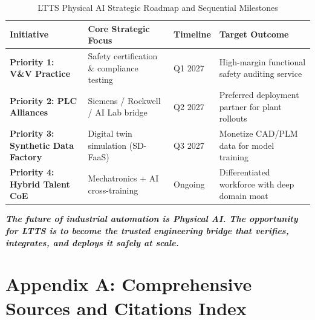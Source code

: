 \documentclass[11pt,a4paper]{article}
\begin{document}
\begin{table}[h!]
\centering
\small
\begin{tabularx}{\textwidth}{@{}l p{4.2cm} l X@{}}
\toprule
\textbf{Initiative} & \textbf{Core Strategic Focus} & \textbf{Timeline} & \textbf{Target Outcome} \\
\midrule
\textbf{Priority 1: V\&V Practice} & Safety certification \& compliance testing & Q1 2027 & High-margin functional safety auditing service \\
\textbf{Priority 2: PLC Alliances} & Siemens / Rockwell / AI Lab bridge & Q2 2027 & Preferred deployment partner for plant rollouts \\
\textbf{Priority 3: Synthetic Data Factory} & Digital twin simulation (SD-FaaS) & Q3 2027 & Monetize CAD/PLM data for model training \\
\textbf{Priority 4: Hybrid Talent CoE} & Mechatronics + AI cross-training & Ongoing & Differentiated workforce with deep domain moat \\
\bottomrule
\end{tabularx}
\caption{LTTS Physical AI Strategic Roadmap and Sequential Milestones}
\end{table}

\vspace{0.4cm}
\begin{center}
\small\color{textdark}\textbf{\textit{The future of industrial automation is Physical AI. The opportunity for LTTS is to become the trusted engineering bridge that verifies, integrates, and deploys it safely at scale.}}
\end{center}

\newpage
\appendix
\section{Appendix A: Comprehensive Sources and Citations Index}
\end{document}
